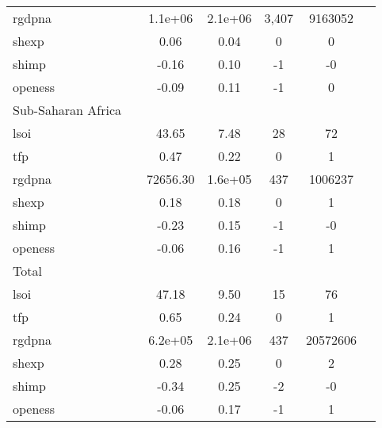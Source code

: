 {\begin{tabular}{l*{1}{cccccc}}
rgdpna      &            &     1.1e+06&     2.1e+06&       3,407&     9163052&            \\
shexp       &            &        0.06&        0.04&           0&           0&            \\
shimp       &            &       -0.16&        0.10&          -1&          -0&            \\
openess     &            &       -0.09&        0.11&          -1&           0&            \\
\hline
Sub-Saharan Africa&            &            &            &            &            &            \\
lsoi        &            &       43.65&        7.48&          28&          72&            \\
tfp         &            &        0.47&        0.22&           0&           1&            \\
rgdpna      &            &    72656.30&     1.6e+05&         437&     1006237&            \\
shexp       &            &        0.18&        0.18&           0&           1&            \\
shimp       &            &       -0.23&        0.15&          -1&          -0&            \\
openess     &            &       -0.06&        0.16&          -1&           1&            \\
\hline
Total       &            &            &            &            &            &            \\
lsoi        &            &       47.18&        9.50&          15&          76&            \\
tfp         &            &        0.65&        0.24&           0&           1&            \\
rgdpna      &            &     6.2e+05&     2.1e+06&         437&    20572606&            \\
shexp       &            &        0.28&        0.25&           0&           2&            \\
shimp       &            &       -0.34&        0.25&          -2&          -0&            \\
openess     &            &       -0.06&        0.17&          -1&           1&            \\
\hline\hline
\end{tabular}
}
